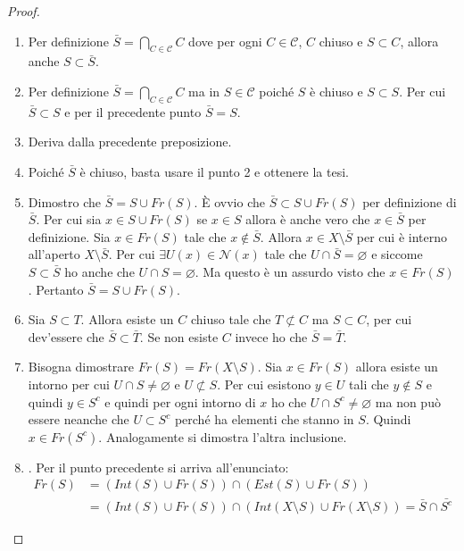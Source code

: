 \begin{proof}
	\begin{enumerate}
		\item Per definizione $\bar{S} = \bigcap_{C \in \mathcal{C}} C$ dove per ogni $C \in \mathcal{C}$, $C$ chiuso e $S \subset C$, allora anche $S \subset \bar{S}$.
		\item Per definizione $\bar{S} = \bigcap_{C \in \mathcal{C}} C$ ma in $S \in \mathcal{C}$ poiché $S$ è chiuso e $S \subset S$. Per cui $\bar{S} \subset S$ e per il precedente punto $\bar{S} = S$.
		\item Deriva dalla precedente preposizione.
		\item Poiché $\bar{S}$ è chiuso, basta usare il punto 2 e ottenere la tesi.
		\item Dimostro che $\bar{S}= S \cup Fr(S)$. È ovvio che $\bar{S} \subset S \cup Fr(S)$ per definizione di $\bar{S}$. Per cui sia $x \in S \cup Fr(S)$ se $x \in S$ allora è anche vero che $x \in \bar{S}$ per definizione. Sia $x \in Fr(S)$ tale che $x \notin \bar{S}$. Allora $x \in X \setminus \bar{S}$ per cui è interno all'aperto $X \setminus \bar{S}$. Per cui $\exists U(x) \in \mathcal{N}(x)$ tale che $U \cap \bar{S} = \varnothing$ e siccome $S \subset \bar{S}$ ho anche che $U \cap S = \varnothing$. Ma questo è un assurdo visto che $x \in Fr(S)$. Pertanto $\bar{S} = S \cup Fr(S)$.
		\item Sia $S \subset T$. Allora esiste un $C$ chiuso tale che $T \not\subset C$ ma $S \subset C$, per cui dev'essere che $\bar{S} \subset \bar{T}$. Se non esiste $C$ invece ho che $\bar{S} = \bar{T}$.
		\item Bisogna dimostrare $Fr(S)= Fr(X \setminus S)$. Sia $x \in Fr(S)$ allora esiste un intorno per cui $U \cap S \neq \varnothing$ e $U \not\subset S$. Per cui esistono $y\in U$ tali che $y \notin S$ e quindi $y \in S^c$ e quindi per ogni intorno di $x$ ho che $U \cap S^c \neq \varnothing$ ma non può essere neanche che $U \subset S^c$ perché ha elementi che stanno in $S$. Quindi $x \in Fr(S^c)$. Analogamente si dimostra l'altra inclusione.  
		\item . Per il punto precedente si arriva all'enunciato:
		\begin{equation}
		\begin{aligned}
			Fr(S) & = (Int(S) \cup Fr(S)) \cap (Est(S) \cup Fr(S)) \\
					& = (Int(S) \cup Fr(S)) \cap (Int(X \setminus S) \cup Fr(X \setminus S)) = \bar{S} \cap \bar{S^c} 
		\end{aligned}
		\end{equation}
	\end{enumerate}
\end{proof}

